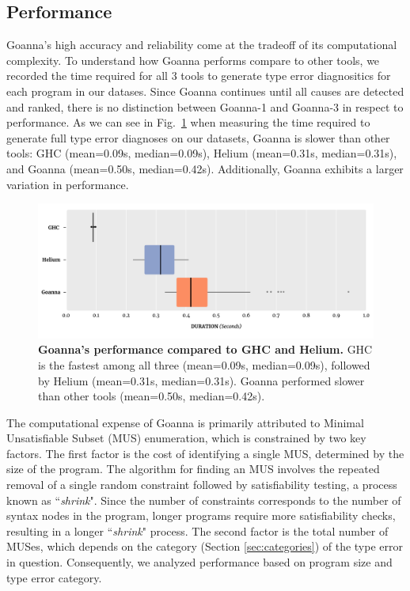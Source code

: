 \documentclass[pdflatex,lineno,sn-nature,Numbered]{sn-jnl}%
\begin{document}
\subsection{Performance} \label{sub:eval-performance}
Goanna's high accuracy and reliability come at the tradeoff of its computational complexity. To understand how Goanna performs compare to other tools, we recorded the time required for all 3 tools to generate type error diagnositics for each program in our datases. Since Goanna continues until all causes are detected and ranked, there is no distinction between Goanna-1 and Goanna-3 in respect to performance. As we can see in Fig.~\ref{fig:performance} when measuring the time required to generate full type error diagnoses on our datasets, Goanna is slower than other tools: GHC (mean=0.09s, median=0.09s), Helium (mean=0.31s, median=0.31s), and Goanna (mean=0.50s, median=0.42s). Additionally, Goanna exhibits a larger variation in performance. 

\begin{figure}[ht!]
    \centering
    \includegraphics[width=\linewidth]{images/ToolCompare}
    \caption{{\bf Goanna's performance compared to GHC and Helium.} GHC is the fastest among all three (mean=0.09s, median=0.09s), followed by Helium (mean=0.31s, median=0.31s). Goanna performed slower than other tools (mean=0.50s, median=0.42s).}
    \label{fig:performance}
\end{figure}

The computational expense of Goanna is primarily attributed to Minimal Unsatisfiable Subset (MUS) enumeration, which is constrained by two key factors. The first factor is the cost of identifying a single MUS, determined by the size of the program. The algorithm for finding an MUS involves the repeated removal of a single random constraint followed by satisfiability testing, a process known as ``{\it shrink}". Since the number of constraints corresponds to the number of syntax nodes in the program, longer programs require more satisfiability checks, resulting in a longer ``{\it shrink}" process. The second factor is the total number of MUSes, which depends on the category (Section \ref{sec:categories}) of the type error in question. Consequently, we analyzed performance based on program size and type error category.
\end{document}
